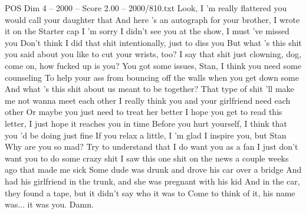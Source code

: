 \begin{textsample}{POS Dim 4 – 2000 – Score 2.00 – 2000/810.txt}
Look, I 'm really flattered you would call your daughter that And here 's an autograph for your brother, I wrote it on the Starter cap I 'm sorry I didn't see you at the show, I must 've missed you Don't think I did that shit intentionally, just to diss you But what 's this shit you said about you like to cut your wrists, too?
I say that shit just clowning, dog, come on, how fucked up is you?
You got some issues, Stan, I think you need some counseling To help your ass from bouncing off the walls when you get down some And what 's this shit about us meant to be together?
That type of shit 'll make me not wanna meet each other I really think you and your girlfriend need each other Or maybe you just need to treat her better I hope you get to read this letter, I just hope it reaches you in time Before you hurt yourself, I think that you 'd be doing just fine If you relax a little, I 'm glad I inspire you, but Stan Why are you so mad?
Try to understand that I do want you as a fan I just don't want you to do some crazy shit I saw this one shit on the news a couple weeks ago that made me sick Some dude was drunk and drove his car over a bridge And had his girlfriend in the trunk, and she was pregnant with his kid And in the car, they found a tape, but it didn't say who it was to Come to think of it, his name was... it was you.
Damn.

\end{textsample}
